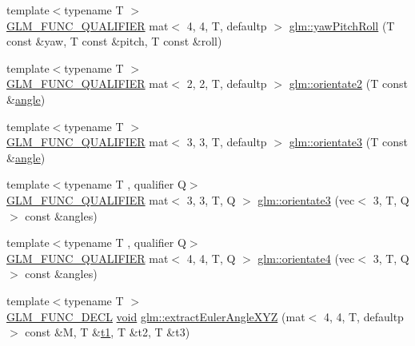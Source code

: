 \begin{DoxyCompactItemize}
{\footnotesize template$<$typename T $>$ }\\\mbox{\hyperlink{setup_8hpp_a33fdea6f91c5f834105f7415e2a64407}{G\+L\+M\+\_\+\+F\+U\+N\+C\+\_\+\+Q\+U\+A\+L\+I\+F\+I\+ER}} mat$<$ 4, 4, T, defaultp $>$ \mbox{\hyperlink{group__gtx__euler__angles_gae6aa26ccb020d281b449619e419a609e}{glm\+::yaw\+Pitch\+Roll}} (T const \&yaw, T const \&pitch, T const \&roll)
\item 
{\footnotesize template$<$typename T $>$ }\\\mbox{\hyperlink{setup_8hpp_a33fdea6f91c5f834105f7415e2a64407}{G\+L\+M\+\_\+\+F\+U\+N\+C\+\_\+\+Q\+U\+A\+L\+I\+F\+I\+ER}} mat$<$ 2, 2, T, defaultp $>$ \mbox{\hyperlink{group__gtx__euler__angles_gae16738a9f1887cf4e4db6a124637608d}{glm\+::orientate2}} (T const \&\mbox{\hyperlink{_s_d_l__opengl__glext_8h_a9e06c1f76a20fed54ca742cd25cb02c4}{angle}})
\item 
{\footnotesize template$<$typename T $>$ }\\\mbox{\hyperlink{setup_8hpp_a33fdea6f91c5f834105f7415e2a64407}{G\+L\+M\+\_\+\+F\+U\+N\+C\+\_\+\+Q\+U\+A\+L\+I\+F\+I\+ER}} mat$<$ 3, 3, T, defaultp $>$ \mbox{\hyperlink{group__gtx__euler__angles_ga7ca98668a5786f19c7b38299ebbc9b4c}{glm\+::orientate3}} (T const \&\mbox{\hyperlink{_s_d_l__opengl__glext_8h_a9e06c1f76a20fed54ca742cd25cb02c4}{angle}})
\item 
{\footnotesize template$<$typename T , qualifier Q$>$ }\\\mbox{\hyperlink{setup_8hpp_a33fdea6f91c5f834105f7415e2a64407}{G\+L\+M\+\_\+\+F\+U\+N\+C\+\_\+\+Q\+U\+A\+L\+I\+F\+I\+ER}} mat$<$ 3, 3, T, Q $>$ \mbox{\hyperlink{group__gtx__euler__angles_ga7238c8e15c7720e3ca6a45ab151eeabb}{glm\+::orientate3}} (vec$<$ 3, T, Q $>$ const \&angles)
\item 
{\footnotesize template$<$typename T , qualifier Q$>$ }\\\mbox{\hyperlink{setup_8hpp_a33fdea6f91c5f834105f7415e2a64407}{G\+L\+M\+\_\+\+F\+U\+N\+C\+\_\+\+Q\+U\+A\+L\+I\+F\+I\+ER}} mat$<$ 4, 4, T, Q $>$ \mbox{\hyperlink{group__gtx__euler__angles_ga4a044653f71a4ecec68e0b623382b48a}{glm\+::orientate4}} (vec$<$ 3, T, Q $>$ const \&angles)
\item 
{\footnotesize template$<$typename T $>$ }\\\mbox{\hyperlink{setup_8hpp_ab2d052de21a70539923e9bcbf6e83a51}{G\+L\+M\+\_\+\+F\+U\+N\+C\+\_\+\+D\+E\+CL}} \mbox{\hyperlink{_s_d_l__opengles2__gl2ext_8h_ae5d8fa23ad07c48bb609509eae494c95}{void}} \mbox{\hyperlink{group__gtx__euler__angles_gacea701562f778c1da4d3a0a1cf091000}{glm\+::extract\+Euler\+Angle\+X\+YZ}} (mat$<$ 4, 4, T, defaultp $>$ const \&M, T \&\mbox{\hyperlink{_s_d_l__opengl__glext_8h_af48031a37b713afa3b0d0d7d29653d7c}{t1}}, T \&t2, T \&t3)

\end{DoxyCompactItemize}
